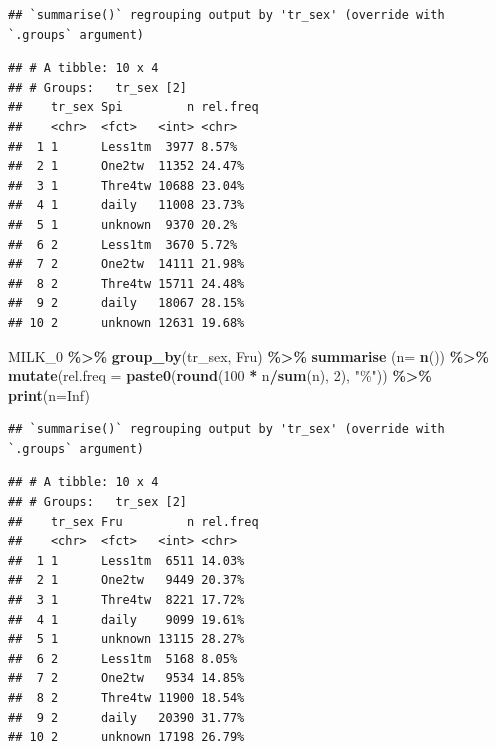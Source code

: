 \documentclass[
]{article}
\newenvironment{Shaded}{\begin{snugshade}}{\end{snugshade}}
\newcommand{\DataTypeTok}[1]{\textcolor[rgb]{0.13,0.29,0.53}{#1}}
\newcommand{\DecValTok}[1]{\textcolor[rgb]{0.00,0.00,0.81}{#1}}
\newcommand{\KeywordTok}[1]{\textcolor[rgb]{0.13,0.29,0.53}{\textbf{#1}}}
\newcommand{\NormalTok}[1]{#1}
\newcommand{\OperatorTok}[1]{\textcolor[rgb]{0.81,0.36,0.00}{\textbf{#1}}}
\newcommand{\OtherTok}[1]{\textcolor[rgb]{0.56,0.35,0.01}{#1}}
\newcommand{\StringTok}[1]{\textcolor[rgb]{0.31,0.60,0.02}{#1}}
\begin{document}
\begin{verbatim}
## `summarise()` regrouping output by 'tr_sex' (override with `.groups` argument)
\end{verbatim}

\begin{verbatim}
## # A tibble: 10 x 4
## # Groups:   tr_sex [2]
##    tr_sex Spi         n rel.freq
##    <chr>  <fct>   <int> <chr>   
##  1 1      Less1tm  3977 8.57%   
##  2 1      One2tw  11352 24.47%  
##  3 1      Thre4tw 10688 23.04%  
##  4 1      daily   11008 23.73%  
##  5 1      unknown  9370 20.2%   
##  6 2      Less1tm  3670 5.72%   
##  7 2      One2tw  14111 21.98%  
##  8 2      Thre4tw 15711 24.48%  
##  9 2      daily   18067 28.15%  
## 10 2      unknown 12631 19.68%
\end{verbatim}

\begin{Shaded}
\begin{Highlighting}[]
\NormalTok{MILK\_}\DecValTok{0} \OperatorTok{\%\textgreater{}\%}\StringTok{ }
\StringTok{  }\KeywordTok{group\_by}\NormalTok{(tr\_sex, Fru) }\OperatorTok{\%\textgreater{}\%}\StringTok{ }
\StringTok{  }\KeywordTok{summarise}\NormalTok{ (}\DataTypeTok{n=} \KeywordTok{n}\NormalTok{()) }\OperatorTok{\%\textgreater{}\%}
\StringTok{  }\KeywordTok{mutate}\NormalTok{(}\DataTypeTok{rel.freq =} \KeywordTok{paste0}\NormalTok{(}\KeywordTok{round}\NormalTok{(}\DecValTok{100} \OperatorTok{*}\StringTok{ }\NormalTok{n}\OperatorTok{/}\KeywordTok{sum}\NormalTok{(n), }\DecValTok{2}\NormalTok{), }\StringTok{"\%"}\NormalTok{))  }\OperatorTok{\%\textgreater{}\%}\StringTok{ }
\StringTok{  }\KeywordTok{print}\NormalTok{(}\DataTypeTok{n=}\OtherTok{Inf}\NormalTok{)}
\end{Highlighting}
\end{Shaded}

\begin{verbatim}
## `summarise()` regrouping output by 'tr_sex' (override with `.groups` argument)
\end{verbatim}

\begin{verbatim}
## # A tibble: 10 x 4
## # Groups:   tr_sex [2]
##    tr_sex Fru         n rel.freq
##    <chr>  <fct>   <int> <chr>   
##  1 1      Less1tm  6511 14.03%  
##  2 1      One2tw   9449 20.37%  
##  3 1      Thre4tw  8221 17.72%  
##  4 1      daily    9099 19.61%  
##  5 1      unknown 13115 28.27%  
##  6 2      Less1tm  5168 8.05%   
##  7 2      One2tw   9534 14.85%  
##  8 2      Thre4tw 11900 18.54%  
##  9 2      daily   20390 31.77%  
## 10 2      unknown 17198 26.79%
\end{verbatim}
\end{document}
